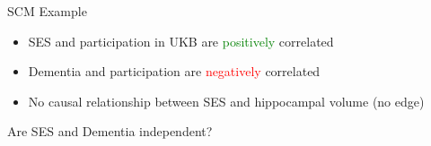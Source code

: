 \documentclass[
  ignorenonframetext,
]{beamer}
\providecommand{\tightlist}{%
  \setlength{\itemsep}{0pt}\setlength{\parskip}{0pt}}
\begin{document}
\begin{frame}{SCM Example}
\protect\hypertarget{scm-example}{}

\begin{figure}
\centering
{}
\end{figure}

\begin{itemize}
\tightlist
\item
  SES and participation in UKB are \textcolor{green}{positively}
  correlated
\item
  Dementia and participation are \textcolor{red}{negatively} correlated
\item
  No causal relationship between SES and hippocampal volume (no edge)
\end{itemize}

Are SES and Dementia independent?

\end{frame}
\end{document}
